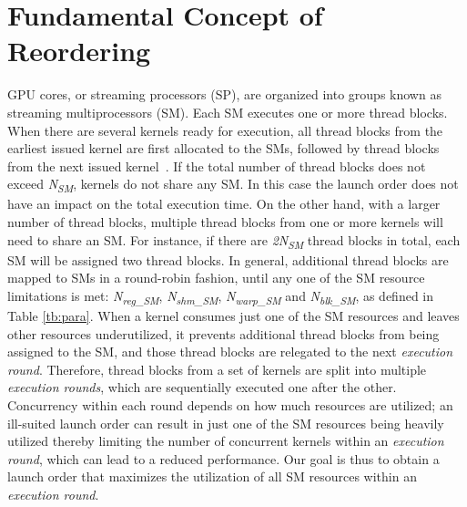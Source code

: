 \documentclass[twocolumn]{el-author}
\begin{document}
\section{Fundamental Concept of Reordering}
GPU cores, or streaming processors (SP), are organized into groups known as
 streaming multiprocessors (SM).  Each SM executes one or more thread blocks. When there are several kernels ready for execution, all thread blocks from the earliest issued kernel are first allocated to the SMs, followed by thread blocks 
 from the next issued kernel~\cite{pai2013improving}. If the total number of thread blocks does not exceed \emph{N\textsubscript{SM}}, kernels do not share any SM. In this case the launch order does not have an impact on the total execution time.  
On the other hand, with a larger number of thread blocks, multiple thread blocks from one or more kernels will need to 
 share an SM.  For instance, if there are \emph{2N\textsubscript{SM}} thread blocks in total, each SM will be assigned two thread blocks.  
In general, additional thread blocks are mapped to SMs in a round-robin fashion, until any one of the SM resource limitations is met: 
 \emph{N\textsubscript{reg\_SM}}, \emph{N\textsubscript{shm\_SM}},
 \emph{N\textsubscript{warp\_SM}} and \emph{N\textsubscript{blk\_SM}}, as defined in Table \ref{tb:para}. 
When a kernel consumes just one of the SM resources and leaves other resources underutilized, it prevents additional thread blocks from 
  being assigned to the SM, and those thread blocks are relegated to the next \emph{execution round}.  Therefore, thread blocks from 
  a set of kernels are split into multiple \emph{execution rounds}, which are sequentially executed one after the other.  Concurrency within 
  each round depends on how much resources are utilized; an ill-suited launch order can result in just one of the SM resources being heavily
  utilized thereby limiting the number of concurrent kernels within an \emph{execution round}, which can lead to a reduced performance.  Our goal is thus to obtain a launch order that maximizes the utilization of all SM 
  resources within an \emph{execution round}.  
  






 
\end{document}
